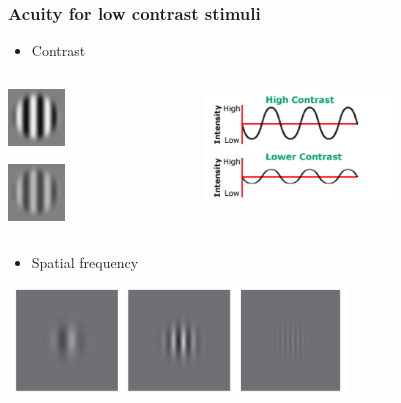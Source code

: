 \documentclass[]{beamer}
\begin{document}
\begin{frame}
\frametitle{Acuity for low contrast stimuli}
\begin{overlayarea}{110mm}{80mm}
\begin{itemize}
 \item Contrast
\end{itemize}
\begin{columns}[T]
 \begin{column}{15mm}
\includegraphics[width=15mm]{figs/l3/high_contrast.jpg}

\includegraphics[width=15mm]{figs/l3/medium_contrast.jpg}
\end{column}

 \begin{column}{50mm}
\includegraphics[width=50mm]{figs/l3/sine_wave_high_low.png}
 \end{column}
\end{columns}

\begin{itemize}
 \item Spatial frequency
\end{itemize}

\begin{center}
\includegraphics[width=90mm]{figs/l3/gabors_sf.png}
\end{center}
\end{overlayarea}
\end{frame}
\end{document}
